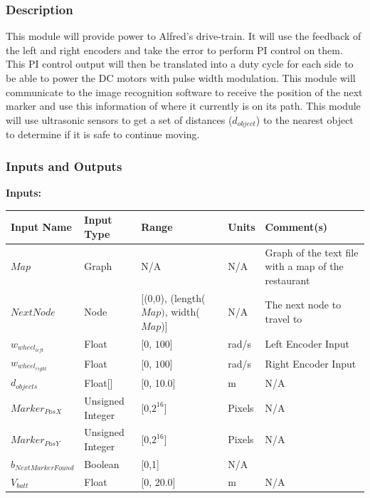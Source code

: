 \documentclass [10pt]{article}
\begin{document}
\subsubsection{Description}
This module will provide power to Alfred's drive-train. It will use the feedback of the left and right encoders and take the error to perform PI control on them. This PI control output will then be translated into a duty cycle for each side to be able to power the DC motors with pulse width modulation. This module will communicate to the image recognition software to receive the position of the next marker and use this information of where it currently is on its path. This module will use ultrasonic sensors to get a set of distances ($ d_{object} $) to the nearest object to determine if it is safe to continue moving.


\subsubsection{Inputs and Outputs}

\textbf{Inputs: } \\

\begin{longtable}{| p{} | p{} | p{} | p{} | p{} |}\hline 
	\rowcolor{tableCell}\textbf{Input Name} & \textbf{Input Type} & \textbf{Range} & \textbf{Units} & \textbf{Comment(s)} \\ \hline
	$ Map $ & Graph & N/A & N/A & Graph of the text file with a map of the restaurant \\ \hline
	\rowcolor{tableCell}$ NextNode $ & Node & [(0,0), (length($Map)$, width($Map$)] & N/A & The next node to travel to \\ \hline
	$ w_{wheel_{left}} $ & Float & [0, $ 100 $]& rad/s &  Left Encoder Input\\ \hline
	\rowcolor{tableCell}$ w_{wheel_{right}} $ & Float & [0, $ 100 $]& rad/s & Right Encoder Input \\ \hline
	$  d_{objects} $ & Float[] & [0, 10.0]& m &  N/A\\ \hline
	\rowcolor{tableCell}$ Marker_{PosX} $ & Unsigned Integer & [0,$2^{16}$] & Pixels &  N/A\\ \hline
	$ Marker_{PosY} $ & Unsigned Integer & [0,$2^{16}$] & Pixels & N/A\\ \hline
	\rowcolor{tableCell}$ b_{NextMarkerFound} $ & Boolean & [0,1] & N/A & \\ \hline
	$  V_{batt} $ & Float & [0, 20.0]& m &  N/A\\ \hline
\end{longtable}
\end{document}
